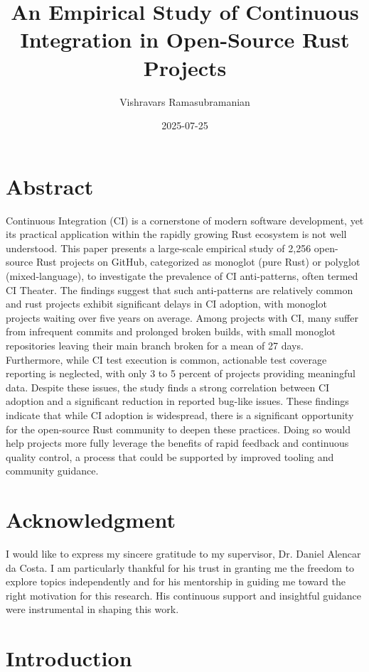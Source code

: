 \documentclass[11pt]{article}
\author{Vishravars Ramasubramanian}
\date{2025-07-25}
\title{An Empirical Study of Continuous Integration in Open-Source Rust Projects}
\begin{document}
\maketitle
\section{Abstract}
Continuous Integration (CI) is a cornerstone of modern software development, yet its practical application within the rapidly growing Rust ecosystem is not well understood. This paper presents a large-scale empirical study of 2,256 open-source Rust projects on GitHub, categorized as monoglot (pure Rust) or polyglot (mixed-language), to investigate the prevalence of CI anti-patterns, often termed CI Theater. The findings suggest that such anti-patterns are relatively common and rust projects exhibit significant delays in CI adoption, with monoglot projects waiting over five years on average. Among projects with CI, many suffer from infrequent commits and prolonged broken builds, with small monoglot repositories leaving their main branch broken for a mean of 27 days. Furthermore, while CI test execution is common, actionable test coverage reporting is neglected, with only 3 to 5 percent of projects providing meaningful data. Despite these issues, the study finds a strong correlation between CI adoption and a significant reduction in reported bug-like issues. These findings indicate that while CI adoption is widespread, there is a significant opportunity for the open-source Rust community to deepen these practices. Doing so would help projects more fully leverage the benefits of rapid feedback and continuous quality control, a process that could be supported by improved tooling and community guidance.

\section{Acknowledgment}

I would like to express my sincere gratitude to my supervisor, Dr. Daniel Alencar da Costa. I am particularly thankful for his trust in granting me the freedom to explore topics independently and for his mentorship in guiding me toward the right motivation for this research. His continuous support and insightful guidance were instrumental in shaping this work.

\section{Introduction}
\end{document}
